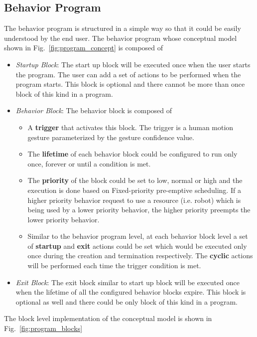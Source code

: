 \documentclass{llncs}
\begin{document}
\subsection{Behavior Program}
\label{ssec:behavior_program}
The behavior program is structured in a simple way so that it could be easily understood by the end user. The behavior program whose conceptual model shown in Fig.~\ref{fig:program_concept} is composed of
\begin{itemize}
\item \emph{Startup Block}: The start up block will be executed once when the user starts the program. The user can add a set of actions to be performed when the program starts. This block is optional and there cannot be more than once block of this kind in a program.
\item \emph{Behavior Block}: The behavior block is composed of
\begin{itemize}
\item A \textbf{trigger} that activates this block. The trigger is a human motion gesture parameterized by the gesture confidence value.
\item The \textbf{lifetime} of each behavior block could be configured to run only once, forever or until a condition is met. 
\item The \textbf{priority} of the block could be set to low, normal or high and the execution is done based on Fixed-priority pre-emptive scheduling. If a higher priority behavior request to use a resource (i.e. robot) which is being used by a lower priority behavior, the higher priority preempts the lower priority behavior.
\item Similar to the behavior program level, at each behavior block level a set of \textbf{startup} and \textbf{exit} actions could be set which would be executed only once during the creation and termination respectively. The \textbf{cyclic} actions will be performed each time the trigger condition is met.
\end{itemize}
\item \emph{Exit Block}: The exit block similar to start up block will be executed once when the lifetime of all the configured behavior blocks expire. This block is optional as well and there could be only block of this kind in a program.
\end{itemize}
The block level implementation of the conceptual model is shown in Fig.~\ref{fig:program_blocks}
\end{document}

